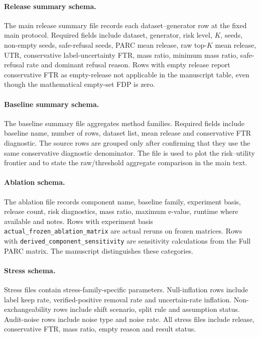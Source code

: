 \documentclass[11pt]{article}
\begin{document}
\paragraph{Release summary schema.}
The main release summary file records each dataset--generator row at the fixed main protocol.
Required fields include dataset, generator, risk level, \(K\), seeds, non-empty seeds, safe-refusal seeds, PARC mean release, raw top-\(K\) mean release, UTR, conservative label-uncertainty FTR, mass ratio, minimum mass ratio, safe-refusal rate and dominant refusal reason.
Rows with empty release report conservative FTR as empty-release not applicable in the manuscript table, even though the mathematical empty-set FDP is zero.

\paragraph{Baseline summary schema.}
The baseline summary file aggregates method families.
Required fields include baseline name, number of rows, dataset list, mean release and conservative FTR diagnostic.
The source rows are grouped only after confirming that they use the same conservative diagnostic denominator.
The file is used to plot the risk--utility frontier and to state the raw/threshold aggregate comparison in the main text.

\paragraph{Ablation schema.}
The ablation file records component name, baseline family, experiment basis, release count, risk diagnostics, mass ratio, maximum e-value, runtime where available and notes.
Rows with experiment basis \texttt{actual\_frozen\_ablation\_matrix} are actual reruns on frozen matrices.
Rows with \texttt{derived\_component\_sensitivity} are sensitivity calculations from the Full PARC matrix.
The manuscript distinguishes these categories.

\paragraph{Stress schema.}
Stress files contain stress-family-specific parameters.
Null-inflation rows include label keep rate, verified-positive removal rate and uncertain-rate inflation.
Non-exchangeability rows include shift scenario, split rule and assumption status.
Audit-noise rows include noise type and noise rate.
All stress files include release, conservative FTR, mass ratio, empty reason and result status.
\end{document}
